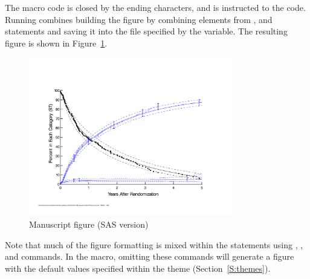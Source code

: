 \documentclass[nojss]{jss}\usepackage[]{graphicx}\usepackage[]{color}
\begin{document}
The  macro code is closed by the ending \code{);} characters, and  is instructed to  the code. Running combines building the figure by combining elements from ,  and  statements and saving it into the file specified by the  variable. The resulting figure is shown in Figure~\ref{F:sasManuscript}.

\begin{figure}[!htpb]
\centering
\includegraphics[width=0.8\textwidth]{../inst/ceStatesST.pdf}
\caption{Manuscript figure (SAS version)}
\label{F:sasManuscript}
\end{figure}

Note that much of the figure formatting is mixed within the  statements using , ,  and  commands. In the  macro, omitting these commands will generate a figure with the default values specified within the  theme (Section~\ref{S:themes}).
\end{document}

